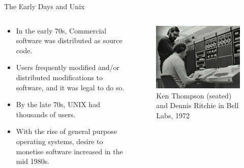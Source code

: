 \documentclass[9pt, dvipsnames]{beamer}
\begin{document}
\begin{frame}{The Early Days and Unix}
    \begin{columns}
        \begin{column}{0.5\textwidth}
            \begin{itemize}
                \item In the early 70s, Commercial software was distributed as source
                code.
                \item Users frequently modified and/or distributed modifications to
                software, and it was legal to do so.
                \item By the late 70s, UNIX had thousands of users.
                \item With the rise of general purpose operating systems, desire to
                monetise software increased in the mid 1980s.
            \end{itemize}
        \end{column}
        \begin{column}{0.5\textwidth}
            \begin{figure}
                \centering
                \includegraphics[width=0.8\linewidth]{assets/unix.jpg}
                \caption{Ken Thompson (seated) and Dennis Ritchie in Bell Labs,
                1972}
            \end{figure}
        \end{column}
    \end{columns}
\end{frame}
\end{document}
